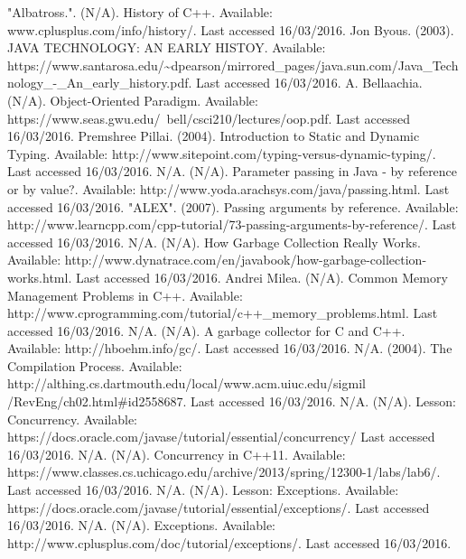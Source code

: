 \documentclass[]{report}
\begin{document}
\begin{thebibliography}{20}
	"Albatross.". (N/A). History of C++. Available: www.cplusplus.com/info/history/. Last accessed 16/03/2016.
	Jon Byous. (2003). JAVA TECHNOLOGY: AN EARLY HISTOY. Available: https://www.santarosa.edu/\textasciitilde{}dpearson/mirrored\_pages/java.sun.com/Java\_Technology\_-\_An\_early\_history.pdf. Last accessed 16/03/2016.
	A. Bellaachia. (N/A). Object-Oriented Paradigm. Available: https://www.seas.gwu.edu/~bell/csci210/lectures/oop.pdf. Last accessed 16/03/2016.
	Premshree Pillai. (2004). Introduction to Static and Dynamic Typing. Available: http://www.sitepoint.com/typing-versus-dynamic-typing/. Last accessed 16/03/2016.
	N/A. (N/A). Parameter passing in Java - by reference or by value?. Available: http://www.yoda.arachsys.com/java/passing.html. Last accessed 16/03/2016.
	"ALEX". (2007). Passing arguments by reference. Available: http://www.learncpp.com/cpp-tutorial/73-passing-arguments-by-reference/. Last accessed 16/03/2016.
	N/A. (N/A). How Garbage Collection Really Works. Available: http://www.dynatrace.com/en/javabook/how-garbage-collection-works.html. Last accessed 16/03/2016.
	Andrei Milea. (N/A). Common Memory Management Problems in C++. Available: http://www.cprogramming.com/tutorial/c++\_memory\_problems.html. Last accessed 16/03/2016.
	N/A. (N/A). A garbage collector for C and C++. Available: http://hboehm.info/gc/. Last accessed 16/03/2016.
	N/A. (2004). The Compilation Process. Available: http://althing.cs.dartmouth.edu/local/www.acm.uiuc.edu/sigmil
	/RevEng/ch02.html\#id2558687. Last accessed 16/03/2016.
	N/A. (N/A). Lesson: Concurrency. Available: https://docs.oracle.com/javase/tutorial/essential/concurrency/ Last accessed 16/03/2016.
	N/A. (N/A). Concurrency in C++11. Available: https://www.classes.cs.uchicago.edu/archive/2013/spring/12300-1/labs/lab6/. Last accessed 16/03/2016.
	N/A. (N/A). Lesson: Exceptions. Available: https://docs.oracle.com/javase/tutorial/essential/exceptions/. Last accessed 16/03/2016.
	N/A. (N/A). Exceptions. Available: http://www.cplusplus.com/doc/tutorial/exceptions/. Last accessed 16/03/2016.
\end{thebibliography}
\end{document}
